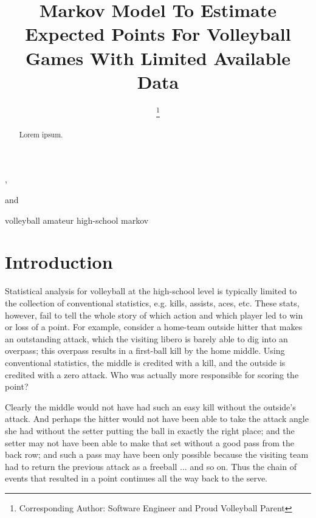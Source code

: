 \documentclass{IOS-Book-Article}
\begin{document}
\begin{frontmatter}

\title{Markov Model To Estimate Expected Points For Volleyball Games With Limited Available Data}

\author[A]{ %
\thanks{Corresponding Author: Software Engineer and Proud Volleyball Parent}},
\author[A]{ }
and
\author[A]{ }

\address[A]{Oconee County High School, Watkinsville, Georgia}

\begin{abstract}
Lorem ipsum.
\end{abstract}

\begin{keyword}
volleyball amateur high-school markov
\end{keyword}
\end{frontmatter}

\thispagestyle{empty}
\pagestyle{empty}

\section{Introduction}
Statistical analysis for volleyball at the high-school level is typically limited to the
collection of conventional statistics, e.g. kills, assists, aces, etc.  These stats, however,
fail to tell the whole story of which action and which player led to win or loss of a point. 
For example, consider a home-team outside hitter that makes an outstanding attack, which the 
visiting libero is barely able to dig into an overpass; this overpass results in a first-ball 
kill by the home middle.  Using conventional statistics, the middle is credited with a kill, and the outside is credited with a zero attack.  Who was actually more responsible for scoring the point?

Clearly the middle would not have had such an easy kill without the outside's attack.  And 
perhaps the hitter would not have been able to take the attack angle she had without the
setter putting the ball in exactly the right place; and the setter may not have been able to 
make that set without a good pass from the back row; and such a pass may have been only 
possible because the visiting team had to return the previous attack as a freeball ... and so 
on. Thus the chain of events that resulted in a point continues all the way back to the serve.
\end{document}

